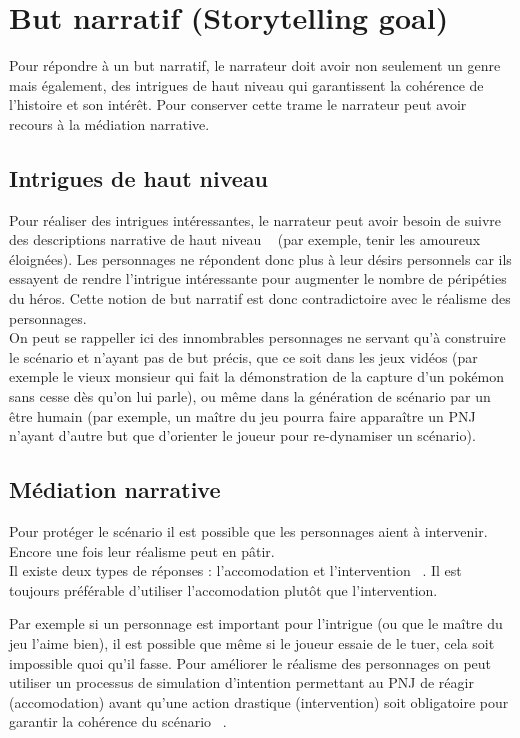 \documentclass[asi]{picINSA}
\begin{document}
\section{But narratif (Storytelling goal)}

Pour répondre à un but narratif, le narrateur doit avoir non seulement un genre mais également, des intrigues de haut niveau 
qui garantissent la cohérence de l'histoire et son intérêt. Pour conserver cette trame le narrateur peut avoir recours à la médiation narrative.

\subsection{Intrigues de haut niveau}

Pour réaliser des intrigues intéressantes, le narrateur peut avoir besoin de suivre des descriptions narrative de haut niveau
~\cite{Ciarlini:2010:ERP:1658866.1658874} (par exemple, tenir les amoureux éloignées). 
Les personnages ne répondent donc plus à leur désirs personnels car ils essayent de rendre l'intrigue intéressante 
pour augmenter le nombre de péripéties du héros. Cette notion de but narratif est donc contradictoire avec le réalisme des personnages. \\

On peut se rappeller ici des innombrables personnages ne servant qu'à construire le scénario et n'ayant pas de but précis, 
que ce soit dans les jeux vidéos (par exemple le vieux monsieur qui fait la démonstration de la capture d'un pokémon sans cesse 
dès qu'on lui parle), ou même dans la génération de scénario par un être humain (par exemple, un maître du jeu pourra faire
 apparaître un PNJ n'ayant d'autre but que d'orienter le joueur pour re-dynamiser un scénario). \\

\subsection{Médiation narrative}

Pour protéger le scénario il est possible que les personnages aient à intervenir. Encore une fois leur réalisme peut en pâtir. \\

Il existe deux types de réponses : l'accomodation et l'intervention ~\cite{riedl2003managing}. 
Il est toujours préférable d'utiliser l'accomodation plutôt que l'intervention.

Par exemple si un personnage est important pour l'intrigue (ou que le maître du jeu l'aime bien), il est possible que même si 
le joueur essaie de le tuer, cela soit impossible quoi qu'il fasse. Pour améliorer le réalisme des personnages 
on peut utiliser un processus de simulation d'intention permettant au PNJ de réagir (accomodation) avant qu'une action drastique (intervention)
soit obligatoire pour garantir la cohérence du scénario ~\cite{Ciarlini:2010:ERP:1658866.1658874}. \\
\end{document}
